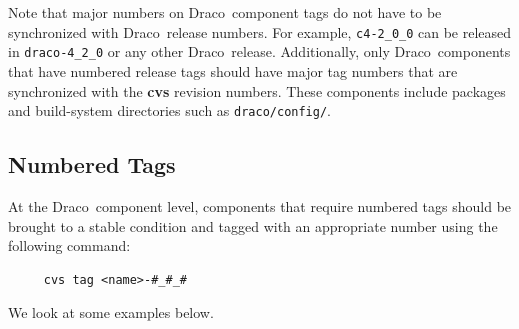 \documentclass[11pt]{nmemo}
\newcommand{\draco}{{\normalfont\normalsize\sffamily Draco}}
\newcommand{\stable}{{\normalfont\normalsize\ttfamily last\_stable}}
\begin{document}
Note that major numbers on \draco\ component tags do not have to be
synchronized with \draco\ release numbers.  For example,
\texttt{c4-2\_0\_0} can be released in \texttt{draco-4\_2\_0} or any
other \draco\ release.  Additionally, only \draco\ components that
have numbered release tags should have major tag numbers that are
synchronized with the {\bf cvs} revision numbers.  These components
include packages and build-system directories such as
\texttt{draco/config/}.



\subsection{Numbered Tags}

At the \draco\ component level, components that require numbered tags
should be brought to a stable condition and tagged with an appropriate
number using the following command:
\begin{verbatim}
     cvs tag <name>-#_#_#
\end{verbatim}
We look at some examples below.
\end{document}
